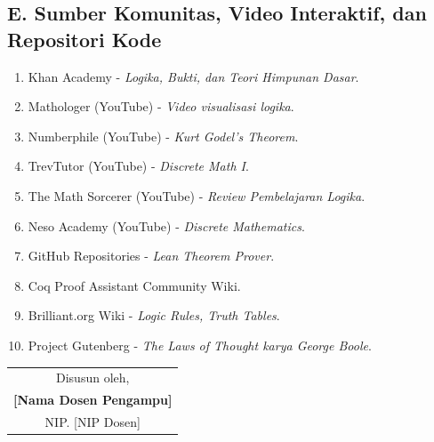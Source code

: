\documentclass[12pt,a4paper]{article}
\begin{document}
\subsection*{E. Sumber Komunitas, Video Interaktif, dan Repositori Kode}
\begin{enumerate}[leftmargin=*, label={E\arabic*.}]
  \item Khan Academy - \textit{Logika, Bukti, dan Teori Himpunan Dasar}.
  \item Mathologer (YouTube) - \textit{Video visualisasi logika}.
  \item Numberphile (YouTube) - \textit{Kurt Godel's Theorem}.
  \item TrevTutor (YouTube) - \textit{Discrete Math I}.
  \item The Math Sorcerer (YouTube) - \textit{Review Pembelajaran Logika}.
  \item Neso Academy (YouTube) - \textit{Discrete Mathematics}.
  \item GitHub Repositories - \textit{Lean Theorem Prover}.
  \item Coq Proof Assistant Community Wiki.
  \item Brilliant.org Wiki - \textit{Logic Rules, Truth Tables}.
  \item Project Gutenberg - \textit{The Laws of Thought karya George Boole}.
\end{enumerate}

\vspace{1cm}

\begin{flushright}
\begin{tabular}{c}
Disusun oleh,\\[2cm]
\textbf{[Nama Dosen Pengampu]}\\
NIP. [NIP Dosen]
\end{tabular}
\end{flushright}
\end{document}
